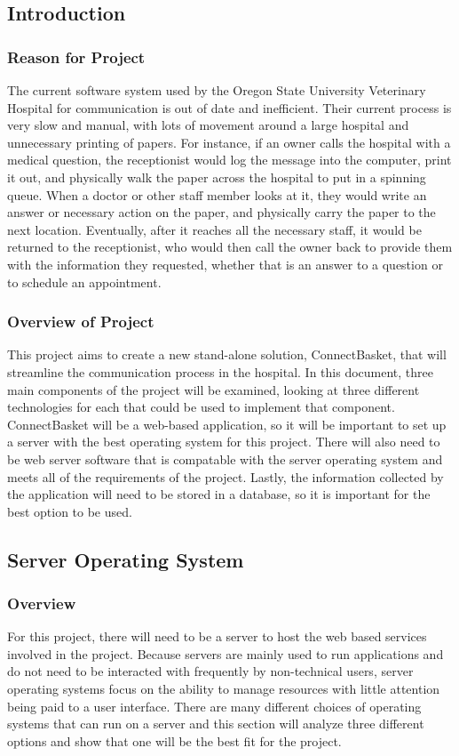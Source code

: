 \documentclass[onecolumn, draftclsnofoot,10pt, compsoc]{IEEEtran}
\begin{document}
\subsection{Introduction}

\subsubsection{Reason for Project}
The current software system used by the Oregon State University Veterinary Hospital for communication is out of date and inefficient. Their current process is very slow and manual, with lots of movement around a large hospital and unnecessary printing of papers. For instance, if an owner calls the hospital with a medical question, the receptionist would log the message into the computer, print it out, and physically walk the paper across the hospital to put in a spinning queue. When a doctor or other staff member looks at it, they would write an answer or necessary action on the paper, and physically carry the paper to the next location. Eventually, after it reaches all the necessary staff, it would be returned to the receptionist, who would then call the owner back to provide them with the information they requested, whether that is an answer to a question or to schedule an appointment. 

\subsubsection{Overview of Project}
This project aims to create a new stand-alone solution, ConnectBasket, that will streamline the communication process in the hospital. In this document, three main components of the project will be examined, looking at three different technologies for each that could be used to implement that component. ConnectBasket will be a web-based application, so it will be important to set up a server with the best operating system for this project. There will also need to be web server software that is compatable with the server operating system and meets all of the requirements of the project. Lastly, the information collected by the application will need to be stored in a database, so it is important for the best option to be used.

\subsection{Server Operating System}

\subsubsection{Overview}
For this project, there will need to be a server to host the web based services involved in the project. Because servers are mainly used to run applications and do not need to be interacted with frequently by non-technical users, server operating systems focus on the ability to manage resources with little attention being paid to a user interface. There are many different choices of operating systems that can run on a server and this section will analyze three different options and show that one will be the best fit for the project.
\end{document}
